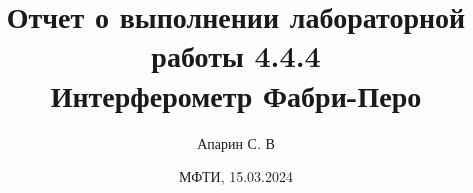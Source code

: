 \title{Отчет о выполнении лабораторной работы 4.4.4 \\ 
\textbf{Интерферометр Фабри-Перо}}
\author{Апарин С. В}
\date{ МФТИ, 15.03.2024 \\}

\maketitle
\vspace {15 mm}
